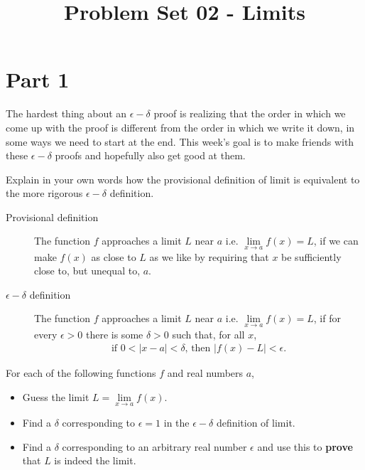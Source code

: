 \documentclass[9pt, a4paper, oneside]{amsart}
\title{Problem Set 02 - Limits}
\begin{document}
\maketitle
\thispagestyle{fancy}


\section*{Part 1}


The hardest thing about an $ \epsilon-\delta$ proof is realizing that the order in which we come up with the proof is different from the order in which we write it down, in some ways we need to start at the end.
This week's goal is to make friends with these $ \epsilon-\delta$ proofs and hopefully also get good at them.\\

\begin{questions}

	\item Explain in your own words how the provisional definition of limit is equivalent to the more rigorous $\epsilon-\delta$ definition.

	\begin{description}
		\item[Provisional definition] The function $f$ approaches a limit $L$ near $a$ i.e. $\lim \limits _ {x \rightarrow a} f(x) = L$, if we can make $f(x)$ as close to $L$ as we like by requiring that $x$ be sufficiently close to, but unequal to, $a$.
		\item[$\epsilon-\delta$ definition] The function $f$ {approaches a limit} $L$ near $a$ i.e. $\lim \limits _ {x \rightarrow a} f(x) = L$, if for every $\epsilon > 0$ there is some $\delta > 0$ such that, for all $x$,
		\begin{align*}
			\mbox{if $0 < |x - a| < \delta$, then $|f(x) - L| < \epsilon$.}
		\end{align*}

	\end{description}

	\item For each of the following functions $f$ and real numbers $a$,
	\begin{itemize}
		\item Guess the limit $L = \lim \limits _ {x \rightarrow a} f(x)$.
		\item Find a $\delta$ corresponding to $\epsilon = 1$ in the $\epsilon - \delta$ definition of limit.
		\item Find a $\delta$ corresponding to an arbitrary real number $\epsilon$ and use this to \textbf{prove} that $L$ is indeed the limit.


\end{itemize}
\end{questions}
\end{document}
